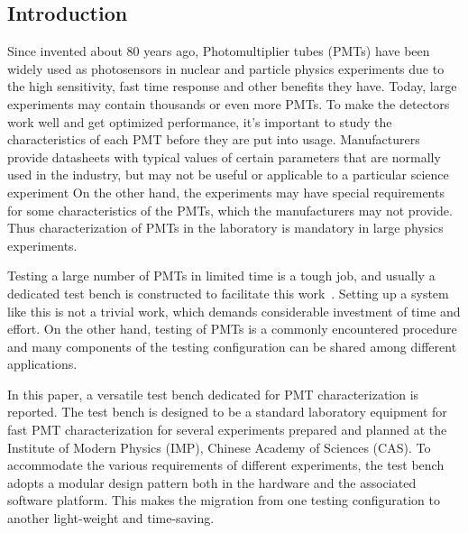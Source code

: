 \documentclass[a4paper,10pt,twoside]{cpc-hepnp}
\begin{document}
%

\begin{multicols}{2}

\section{Introduction}
\label{sec:introduction}

Since invented about 80 years ago, Photomultiplier tubes (PMTs) have been widely used as photosensors in nuclear and particle physics experiments due to the high sensitivity, fast time response and other benefits they have. 
Today, large experiments may contain thousands or even more PMTs. To make the detectors work well and get optimized performance, it's important to study the characteristics of each PMT before they are put into usage. 
Manufacturers provide datasheets with typical values of certain parameters that are normally used in the industry, but may not be useful or applicable to a particular science experiment
On the other hand, the experiments may have special requirements for some characteristics of the PMTs, which the manufacturers may not provide. 
Thus characterization of PMTs in the laboratory is mandatory in large physics experiments.

Testing a large number of PMTs in limited time is a tough job, and usually a dedicated test bench is constructed to facilitate this work~\citep{barnhill_testing_2008,akgun_complete_2005,adragna_pmt-block_2006}.
Setting up a system like this is not a trivial work, which demands considerable investment of time and effort.
On the other hand, testing of PMTs is a commonly encountered procedure and many components of the testing configuration can be shared among different applications.

In this paper, a versatile test bench dedicated for PMT characterization is reported.
The test bench is designed to be a standard laboratory equipment for fast PMT characterization for several experiments prepared and planned at the Institute of Modern Physics (IMP), Chinese Academy of Sciences (CAS).
To accommodate the various requirements of different experiments, the test bench adopts a modular design pattern both in the hardware and the associated software platform.
This makes the migration from one testing configuration to another light-weight and time-saving.


\end{multicols}
\end{document}
